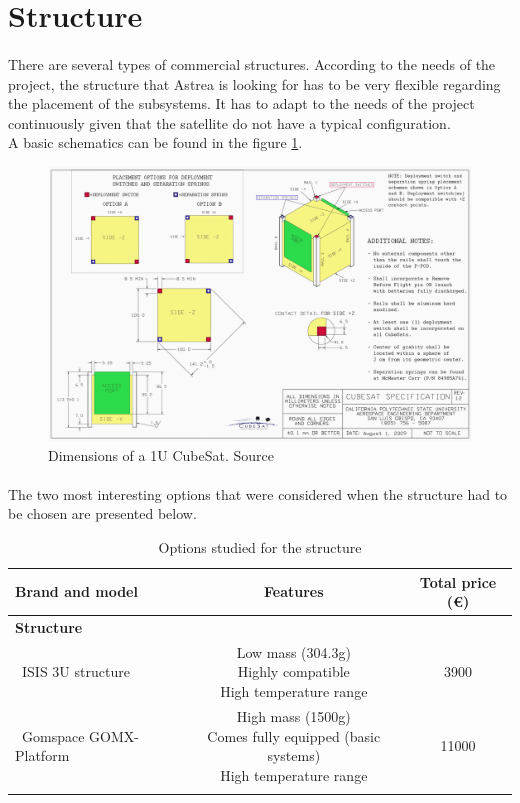\section{Structure}
\paragraph{}There are several types of commercial structures. According to the needs of the project, the structure that Astrea is looking for has to be very flexible regarding the placement of the subsystems. It has to adapt to the needs of the project continuously given that the satellite do not have a typical configuration.\\
A basic schematics can be found in the figure \ref{epsschematics}.

\begin{figure}[h!]
\includegraphics[scale=0.6]{./sections/SatelliteDept/sections/images/CubeSatDesign}
\centering
\caption{Dimensions of a 1U CubeSat. Source \cite{cubesatdimensions}}
\label{epsschematics}
\end{figure}

\paragraph{}The two most interesting options that were considered when the structure had to be chosen are presented below.

\begin{longtable}{| l | c | c | }
\hline
\rowcolor[gray]{0.80}	\textbf{Brand and model} &  \textbf{Features}     & \textbf{Total price (\euro)}   \\
\hline
\endfirsthead

\rowcolor[gray]{0.85} \textbf{Structure} &  &  \\
	   ~ISIS 3U structure & \makecell{Low mass (304.3g) \\ Highly compatible \\ High temperature range} & 3900 \\
	   \hline
	   ~Gomspace GOMX-Platform & \makecell{High mass (1500g) \\ Comes fully equipped (basic systems) \\ High temperature range} & 11000 \\
	   \hline
\caption{Options studied for the structure}
\label{structureoptions}
\end{longtable}

